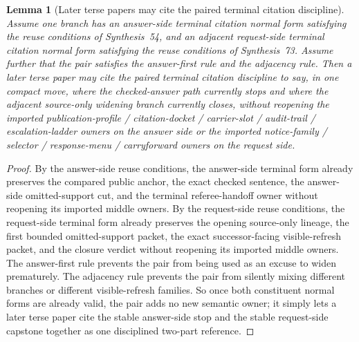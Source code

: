 \documentclass[11pt]{article}
\newtheorem{lemma}{Lemma}
\begin{document}
\begin{lemma}[Later terse papers may cite the paired terminal citation discipline]
Assume one branch has an answer-side terminal citation normal form satisfying the reuse conditions of Synthesis~54, and an adjacent request-side terminal citation normal form satisfying the reuse conditions of Synthesis~73.
Assume further that the pair satisfies the answer-first rule and the adjacency rule.
Then a later terse paper may cite the paired terminal citation discipline to say, in one compact move, where the checked-answer path currently stops and where the adjacent source-only widening branch currently closes, without reopening the imported publication-profile / citation-docket / carrier-slot / audit-trail / escalation-ladder owners on the answer side or the imported notice-family / selector / response-menu / carryforward owners on the request side.
\end{lemma}

\begin{proof}
By the answer-side reuse conditions, the answer-side terminal form already preserves the compared public anchor, the exact checked sentence, the answer-side omitted-support cut, and the terminal referee-handoff owner without reopening its imported middle owners.
By the request-side reuse conditions, the request-side terminal form already preserves the opening source-only lineage, the first bounded omitted-support packet, the exact successor-facing visible-refresh packet, and the closure verdict without reopening its imported middle owners.
The answer-first rule prevents the pair from being used as an excuse to widen prematurely.
The adjacency rule prevents the pair from silently mixing different branches or different visible-refresh families.
So once both constituent normal forms are already valid, the pair adds no new semantic owner; it simply lets a later terse paper cite the stable answer-side stop and the stable request-side capstone together as one disciplined two-part reference.\qedhere
\end{proof}
\end{document}
